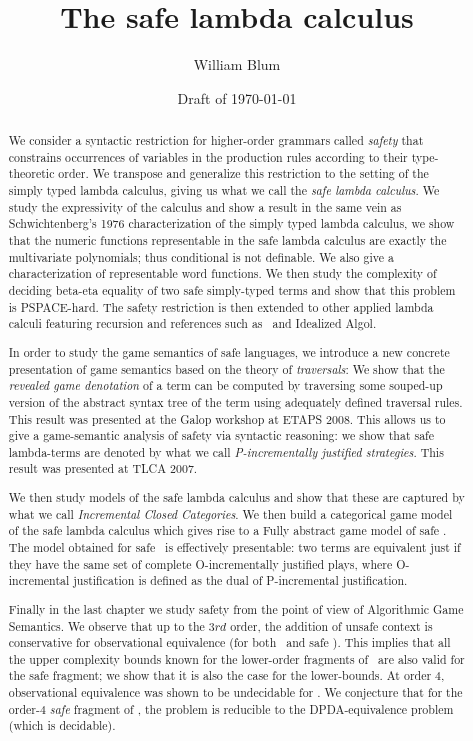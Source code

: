 \documentclass[a4paper,twoside,openright,draft]{ociamthesis}
\author{William Blum}
\title{The safe lambda calculus}
\date{Draft of \today}
\begin{document}
\maketitle

\begin{abstract}
We consider a syntactic restriction for higher-order grammars called \emph{safety}  that  constrains occurrences of variables in the production rules according to their type-theoretic order. We transpose and generalize this restriction to the setting of the simply typed lambda calculus, giving us what we call the \emph{safe lambda calculus}.  We study the expressivity of the calculus and show a result in the same vein as Schwichtenberg's 1976 characterization of the simply typed lambda calculus, we show that the numeric functions representable in the safe lambda calculus are exactly the
multivariate polynomials; thus conditional is not definable. We
also give a characterization of representable word functions.
We then study the complexity of deciding beta-eta equality of two safe simply-typed terms and show that this problem is PSPACE-hard. The safety restriction is then extended to other applied lambda calculi featuring recursion and references such as \pcf\ and Idealized Algol.

In order to study the game semantics of safe languages, we introduce a new concrete presentation of game semantics based on the theory of \emph{traversals}: We show that the \emph{revealed game denotation} of a term can be computed by traversing some souped-up version of the abstract syntax tree of the term using adequately defined traversal rules. This result was presented at the Galop workshop at ETAPS 2008. This allows us to give a game-semantic analysis of safety via syntactic reasoning: we show that safe lambda-terms are denoted by what we call \emph{P-incrementally justified strategies}. This result was presented at TLCA 2007.

We then study models of the safe lambda calculus and show that these are captured by what we call \emph{Incremental Closed Categories}. We then build a categorical game model of the safe lambda calculus which gives rise to a Fully abstract game model of safe \ialgol.
The model obtained for safe \ialgol\ is effectively presentable: two terms are equivalent just if they have the same set of complete O-incrementally justified plays, where O-incremental justification is defined as the dual of P-incremental justification.

Finally in the last chapter we study safety from the point of view of Algorithmic Game Semantics.  We observe that up to the $3rd$ order, the addition of unsafe context is conservative for observational equivalence (for both \ialgol\ and safe \ialgol). This implies that all the upper complexity bounds known for the lower-order fragments of \ialgol\ are also valid for the safe fragment; we show that it is also the case for the lower-bounds. At order $4$, observational equivalence was shown to be undecidable for \ialgol.
We conjecture that for the order-$4$ \emph{safe} fragment of \ialgol, the problem is reducible to the DPDA-equivalence problem (which is decidable).


\end{abstract}
\end{document}
